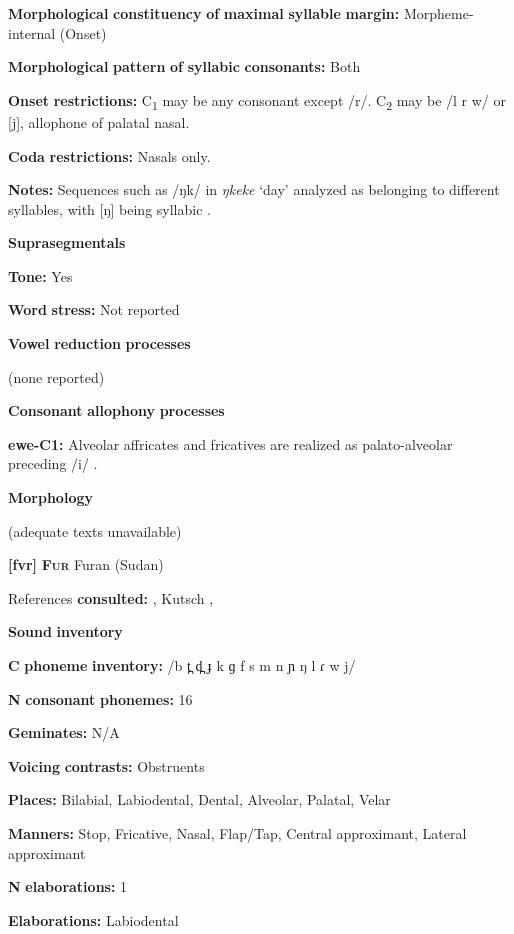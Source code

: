 \textbf{Morphological} \textbf{constituency} \textbf{of} \textbf{maximal} \textbf{syllable} \textbf{margin:} Morpheme-internal (Onset)

\textbf{Morphological} \textbf{pattern} \textbf{of} \textbf{syllabic} \textbf{consonants:} Both

\textbf{Onset} \textbf{restrictions:} C\textsubscript{1} may be any consonant except /r/. C\textsubscript{2} may be /l r w/ or [j], allophone of palatal nasal.

\textbf{Coda} \textbf{restrictions:} Nasals only.

\textbf{Notes:} Sequences such as /ŋk/ in \textit{ŋkeke} ‘day’ analyzed as belonging to different syllables, with [ŋ] being syllabic \citep[39]{Ameka1991}.

\textbf{Suprasegmentals}

\textbf{Tone:} Yes

\textbf{Word} \textbf{stress:} Not reported

\textbf{Vowel} \textbf{reduction} \textbf{processes}

(none reported)

\textbf{Consonant} \textbf{allophony} \textbf{processes}

\textbf{ewe-C1:} Alveolar affricates and fricatives are realized as palato-alveolar preceding /i/ \citep[9]{Jalloh2005}.

\textbf{Morphology}

(adequate texts unavailable)

\textbf{[fvr]}   \textbf{\textsc{Fur}}  Furan (Sudan)

References \textbf{consulted:} \citet{Jakobi1990}, Kutsch \citet{LojengaWaag2004}, \citet{Noel2008}

\textbf{Sound} \textbf{inventory}

\textbf{C} \textbf{phoneme} \textbf{inventory:} /b t̪ d̪ ɟ k ɡ f s m n ɲ ŋ l ɾ w j/

\textbf{N} \textbf{consonant} \textbf{phonemes:} 16

\textbf{Geminates:} N/A

\textbf{Voicing} \textbf{contrasts:} Obstruents

\textbf{Places:} Bilabial, Labiodental, Dental, Alveolar, Palatal, Velar

\textbf{Manners:} Stop, Fricative, Nasal, Flap/Tap, Central approximant, Lateral approximant

\textbf{N} \textbf{elaborations:} 1

\textbf{Elaborations:} Labiodental

